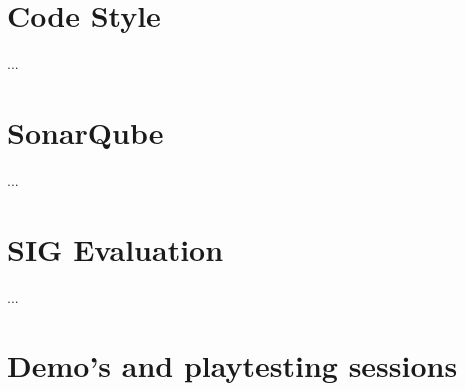	\section{Code Style} \label{sec:codestyle}
		...
		
	\section{SonarQube} \label{sec:sonarqube}
		...
		
	\section{SIG Evaluation} \label{sec:sigevaluation}
		...
		
	\section{Demo's and playtesting sessions} \label{sec:demos}
